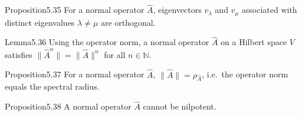 \begin{res}{Proposition}{5.35}
For a normal operator $\hat A$, eigenvectors $v_\lambda$ and $v_\mu$ associated with distinct eigenvalues $\lambda\ne\mu$ are orthogonal.
\end{res}

\begin{res}{Lemma}{5.36}
Using the operator norm, a normal operator $\hat A$ on a Hilbert space $V$ satisfies $\|\hat A^n\|=\|\hat A\|^n$ for all $n\in\mathbb N$.
\end{res}

\begin{res}{Proposition}{5.37}
For a normal operator $\hat A$, $\|\hat A\|=\rho_{\hat A}$, i.e.\ the operator norm equals the spectral radius.
\end{res}

\begin{res}{Proposition}{5.38}
A normal operator $\hat A$ cannot be nilpotent.
\end{res}
